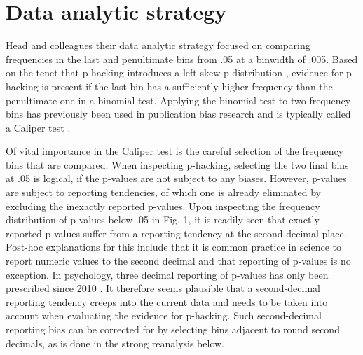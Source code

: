 \section*{Data analytic strategy}
Head and colleagues their data analytic strategy focused on comparing frequencies in the last and penultimate bins from .05 at a binwidth of .005. Based on the tenet that p-hacking introduces a left skew p-distribution \cite{Simonsohn2014}, evidence for p-hacking is present if the last bin has a sufficiently higher frequency than the penultimate one in a binomial test. Applying the binomial test to two frequency bins has previously been used in publication bias research and is typically called a Caliper test \cite{gerber2010, kuhberger2014}.

Of vital importance in the Caliper test is the careful selection of the frequency bins that are compared. When inspecting p-hacking, selecting the two final bins at .05 is logical, if the p-values are not subject to any biases. However, p-values are subject to reporting tendencies, of which one is already eliminated by excluding the inexactly reported p-values. Upon inspecting the frequency distribution of p-values below .05 in Fig. 1, it is readily seen that exactly reported p-values suffer from a reporting tendency at the second decimal place. Post-hoc explanations for this include that it is common practice in science to report numeric values to the second decimal and that reporting of p-values is no exception. In psychology, three decimal reporting of p-values has only been prescribed since 2010 \cite{AmericanPsychologicalAssociation2010}. It therefore seems plausible that a second-decimal reporting tendency creeps into the current data and needs to be taken into account when evaluating the evidence for p-hacking. Such second-decimal reporting bias can be corrected for by selecting bins adjacent to round second decimals, as is done in the strong reanalysis below.